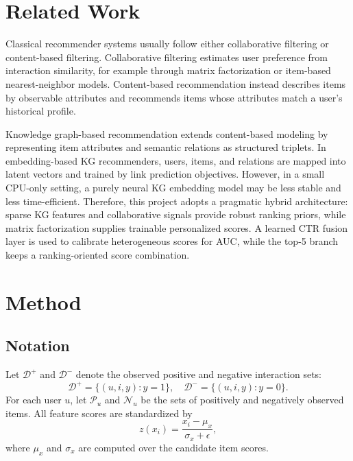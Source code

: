 \documentclass[onecolumn,a4paper,12pt]{IEEEtran}
\begin{document}
\section{Related Work}

Classical recommender systems usually follow either collaborative filtering or content-based filtering. Collaborative filtering estimates user preference from interaction similarity, for example through matrix factorization or item-based nearest-neighbor models. Content-based recommendation instead describes items by observable attributes and recommends items whose attributes match a user's historical profile.

Knowledge graph-based recommendation extends content-based modeling by representing item attributes and semantic relations as structured triplets. In embedding-based KG recommenders, users, items, and relations are mapped into latent vectors and trained by link prediction objectives. However, in a small CPU-only setting, a purely neural KG embedding model may be less stable and less time-efficient. Therefore, this project adopts a pragmatic hybrid architecture: sparse KG features and collaborative signals provide robust ranking priors, while matrix factorization supplies trainable personalized scores. A learned CTR fusion layer is used to calibrate heterogeneous scores for AUC, while the top-5 branch keeps a ranking-oriented score combination.

\section{Method}

\subsection{Notation}

Let $\mathcal{D}^{+}$ and $\mathcal{D}^{-}$ denote the observed positive and negative interaction sets:
\begin{equation}
    \mathcal{D}^{+}=\{(u,i,y):y=1\}, \quad
    \mathcal{D}^{-}=\{(u,i,y):y=0\}.
\end{equation}
For each user $u$, let $\mathcal{P}_u$ and $\mathcal{N}_u$ be the sets of positively and negatively observed items. All feature scores are standardized by
\begin{equation}
    z(x_i)=\frac{x_i-\mu_x}{\sigma_x+\epsilon},
\end{equation}
where $\mu_x$ and $\sigma_x$ are computed over the candidate item scores.
\end{document}
